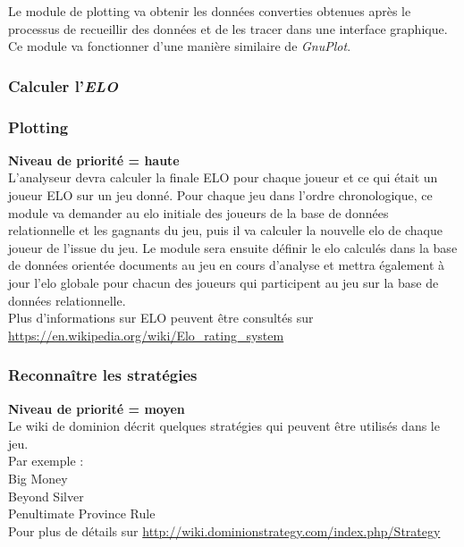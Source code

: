 Le module de plotting va obtenir les données converties obtenues après le processus de recueillir des données et de les tracer dans une interface graphique. Ce module va fonctionner d'une manière similaire de \textit{GnuPlot}.

\subsubsection{Calculer l'\textit{\textbf{ELO}}}
\subsubsection{Plotting}
\textbf{Niveau de priorité = haute}\\

L'analyseur devra calculer la finale ELO pour chaque joueur et ce qui était un joueur ELO sur un jeu donné.
Pour chaque jeu dans l'ordre chronologique, ce module va demander au elo initiale des joueurs de la base de données relationnelle et les gagnants du jeu, puis il va calculer la nouvelle elo de chaque joueur de l'issue du jeu. Le module sera ensuite définir le elo calculés dans la base de données orientée documents au jeu en cours d'analyse et mettra également à jour l'elo globale pour chacun des joueurs qui participent au jeu sur la base de données relationnelle.\\

Plus d'informations sur ELO peuvent être consultés sur \url{https://en.wikipedia.org/wiki/Elo_rating_system}\\

\subsubsection{Reconnaître les stratégies}
\textbf{Niveau de priorité = moyen}\\

Le wiki de dominion décrit quelques stratégies qui peuvent être utilisés dans le jeu.\\Par exemple :\\
Big Money\\
Beyond Silver\\
Penultimate Province Rule\\
Pour plus de détails sur \url{http://wiki.dominionstrategy.com/index.php/Strategy}\\



